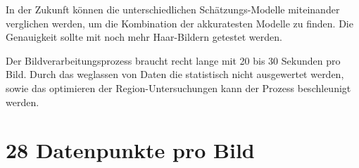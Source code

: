 \documentclass[german,a4paper, 12pt]{llncs}
\begin{document}
In der Zukunft können die unterschiedlichen Schätzungs-Modelle miteinander verglichen werden, um die Kombination der akkuratesten Modelle zu finden. Die Genauigkeit sollte mit noch mehr Haar-Bildern getestet werden. 

Der Bildverarbeitungsprozess braucht recht lange mit 20 bis 30 Sekunden pro Bild. Durch das weglassen von Daten die statistisch nicht ausgewertet werden, sowie das optimieren der Region-Untersuchungen kann der Prozess beschleunigt werden. 


\newpage

\nocite{*}
\printbibliography

\appendix
\section{28 Datenpunkte pro Bild}
\label{appendix:datenpunkte}
\end{document}

